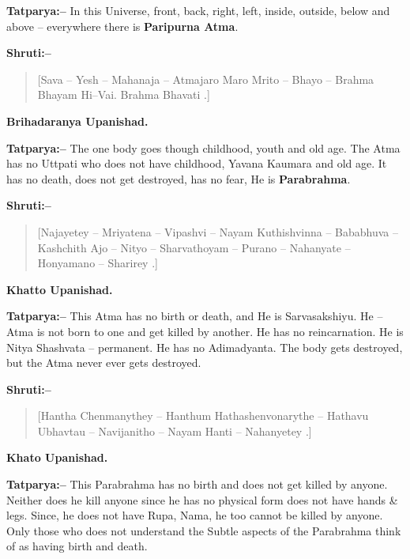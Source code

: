 \textbf{Tatparya:–} In this Universe, front, back, right, left, inside, outside, below and above – everywhere there is \textbf{Paripurna Atma}.

\textbf{Shruti:–}

\begin{verse}
[Sava – Yesh – Mahanaja – Atmajaro Maro Mrito – Bhayo – Brahma Bhayam Hi–Vai. Brahma Bhavati .]
\end{verse}

\begin{flushright}
\textbf{Brihadaranya Upanishad.}
\end{flushright}

\textbf{Tatparya:–} The one body goes though childhood, youth and old age. The Atma has no Uttpati who does not have childhood, Yavana Kaumara and old age. It has no death, does not get destroyed, has no fear, He is \textbf{Parabrahma}.

\textbf{Shruti:–}

\begin{verse}
[Najayetey – Mriyatena – Vipashvi – Nayam  Kuthishvinna – Bababhuva – Kashchith  Ajo – Nityo – Sharvathoyam – Purano – Nahanyate – Honyamano – Sharirey .]
\end{verse}

\begin{flushright}
\textbf{Khatto Upanishad.}
\end{flushright}

\textbf{Tatparya:–} This Atma has no birth or death, and He is Sarvasakshiyu. He – Atma is not born to one and get killed by another. He has no reincarnation. He is Nitya Shashvata – permanent. He has no Adimadyanta. The body gets destroyed, but the Atma never ever gets destroyed.

\textbf{Shruti:–}

\begin{verse}
[Hantha Chenmanythey – Hanthum Hathashenvonarythe – Hathavu Ubhavtau – Navijanitho – Nayam Hanti – Nahanyetey .]
\end{verse}

\begin{flushright}
\textbf{Khato Upanishad.}
\end{flushright}

\textbf{Tatparya:–} This Parabrahma has no birth and does not get killed by anyone. Neither does he kill anyone since he has no physical form does not have hands \& legs. Since, he does not have Rupa, Nama, he too cannot be killed by anyone. Only those who does not understand the Subtle aspects of the Parabrahma think of as having birth and death.

